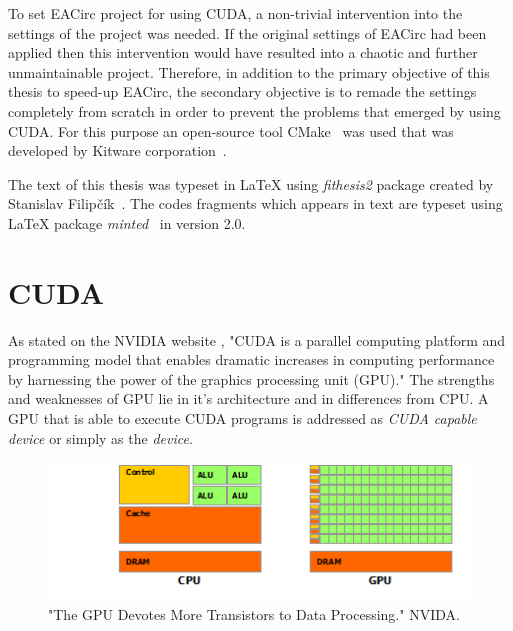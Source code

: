 \documentclass[12pt,oneside]{fithesis2}
\begin{document}
\bigskip

To set EACirc project for using CUDA, a non-trivial intervention into the settings of the project was needed. If the original settings of EACirc had been applied then this intervention would have resulted into a chaotic and further unmaintainable project. Therefore, in addition to the primary objective of this thesis to speed-up EACirc, the secondary objective is to remade the settings completely from scratch in order to prevent the problems that emerged by using CUDA. For this purpose an open-source tool CMake~\cite{cmake} was used that was developed by Kitware corporation~\cite{kitware}.

\bigskip

The text of this thesis was typeset in \LaTeX{} using \textit{fithesis2} package created by Stanislav Filipčík~\cite{fithesis}. The codes fragments which appears in text are typeset using \LaTeX{} package \textit{minted}~\cite{minted} in version 2.0.





\chapter{CUDA}
As stated on the NVIDIA website \cite{about_cuda}, "CUDA is a parallel computing platform and programming model that enables dramatic increases in computing performance by harnessing the power of the graphics processing unit (GPU)." The strengths and weaknesses of GPU lie in it's architecture and in differences from CPU. A GPU that is able to execute CUDA programs is addressed as \emph{CUDA capable device} or simply as the \emph{device}.

\begin{figure}[H]
	\centering
	\includegraphics{figures/gpu-devotes-more-transistors-to-data-processing.png}
	\caption{"The GPU Devotes More Transistors to Data Processing." NVIDA. \cite{cuda_guide}}
	\label{fig:cpu_vs_gpu_arch}
\end{figure}
\end{document}
